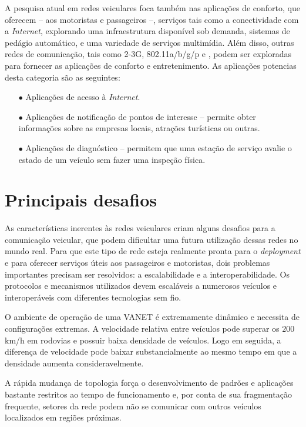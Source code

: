 A pesquisa atual em redes veiculares foca também nas aplicações de conforto,
que oferecem -- aos motoristas e passageiros --, serviços tais como a
conectividade com a \textit{Internet}, explorando uma infraestrutura disponível
sob demanda, sistemas de pedágio automático, e uma variedade de serviços
multimídia. Além disso, outras redes de comunicação, tais como 2-3G,
802.11a/b/g/p e , podem ser exploradas para fornecer as aplicações de conforto e
entretenimento. As aplicações potencias desta categoria são as seguintes:

\begin{enumerate}
 \item[$\bullet$] Aplicações de acesso à \textit{Internet}.
 \item[$\bullet$] Aplicações de notificação de pontos de interesse -- permite
 obter informações sobre as empresas locais, atrações turísticas ou outras.
 \item[$\bullet$] Aplicações de diagnóstico -- permitem que uma estação de
 serviço avalie o estado de um veículo sem fazer uma inspeção física.
\end{enumerate}
 
\section{Principais desafios}
As características inerentes às redes veiculares criam alguns desafios para a
comunicação veicular, que podem dificultar uma futura utilização dessas redes no
mundo real. Para que este tipo de rede esteja realmente pronta para o
\textit{deployment} e para oferecer serviços úteis aos passageiros e
motoristas, dois problemas importantes precisam ser resolvidos: a
escalabilidade e a interoperabilidade. Os protocolos e mecanismos utilizados
devem escaláveis a numerosos veículos e interoperáveis com diferentes
tecnologias sem fio.

O ambiente de operação de uma VANET é extremamente dinâmico e necessita de
configurações extremas. A velocidade relativa entre veículos pode superar os
$200$ km/h em rodovias e possuir baixa densidade de veículos. Logo em seguida, a
diferença de velocidade pode baixar substancialmente ao mesmo tempo em que a
densidade aumenta consideravelmente.

A rápida mudança de topologia força o desenvolvimento de padrões e aplicações
bastante restritos ao tempo de funcionamento e, por conta de sua fragmentação
frequente, setores da rede podem não se comunicar com outros veículos
localizados em regiões próximas.


